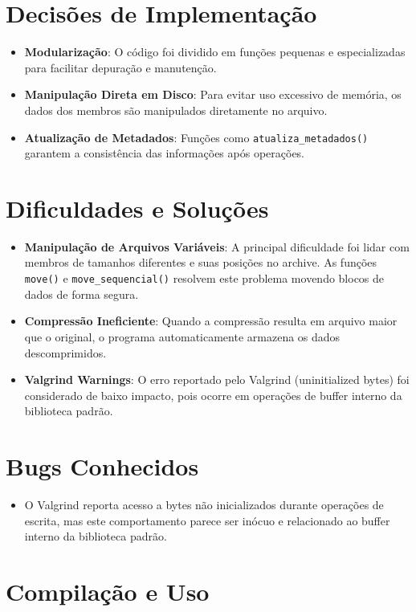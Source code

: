 \documentclass{article}
\begin{document}
\section{Decisões de Implementação}
\begin{itemize}
    \item \textbf{Modularização}: O código foi dividido em funções pequenas e especializadas para facilitar depuração e manutenção.
    \item \textbf{Manipulação Direta em Disco}: Para evitar uso excessivo de memória, os dados dos membros são manipulados diretamente no arquivo.
    \item \textbf{Atualização de Metadados}: Funções como \texttt{atualiza\_metadados()} garantem a consistência das informações após operações.
\end{itemize}

\section{Dificuldades e Soluções}
\begin{itemize}
    \item \textbf{Manipulação de Arquivos Variáveis}: A principal dificuldade foi lidar com membros de tamanhos diferentes e suas posições no archive. As funções \texttt{move()} e \texttt{move\_sequencial()} resolvem este problema movendo blocos de dados de forma segura.
    \item \textbf{Compressão Ineficiente}: Quando a compressão resulta em arquivo maior que o original, o programa automaticamente armazena os dados descomprimidos.
    \item \textbf{Valgrind Warnings}: O erro reportado pelo Valgrind (uninitialized bytes) foi considerado de baixo impacto, pois ocorre em operações de buffer interno da biblioteca padrão.
\end{itemize}

\section{Bugs Conhecidos}
\begin{itemize}
    \item O Valgrind reporta acesso a bytes não inicializados durante operações de escrita, mas este comportamento parece ser inócuo e relacionado ao buffer interno da biblioteca padrão.
\end{itemize}

\section{Compilação e Uso}
\end{document}
